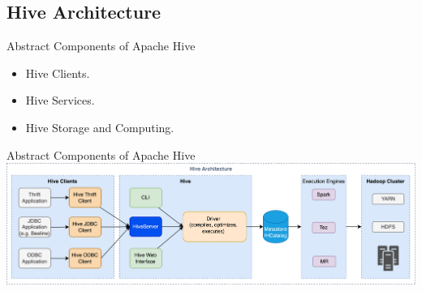 
\subsection{Hive Architecture}

\begin{frame}{Abstract Components of Apache Hive}
	\begin{itemize}
		\item Hive Clients.
		\item Hive Services.
		\item Hive Storage and Computing.
	\end{itemize}
	\end{frame}
	
\begin{frame}{Abstract Components of Apache Hive}
	\includegraphics[width=\linewidth,height=.8\textheight]{./Figures/chapter-03/Hive_Architecture.jpg}
\end{frame}
	

